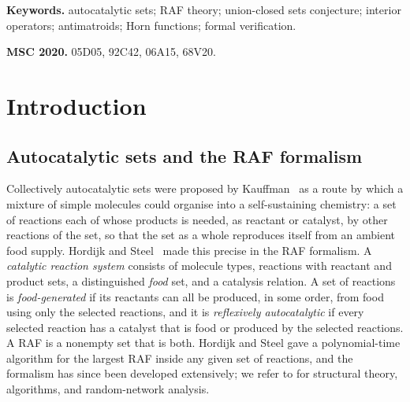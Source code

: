 \documentclass[11pt,a4paper]{article}
\theoremstyle{plain}
\theoremstyle{definition}
\theoremstyle{remark}
\begin{document}
\noindent\textbf{Keywords.} autocatalytic sets; RAF theory; union-closed sets conjecture; interior operators; antimatroids; Horn functions; formal verification.

\noindent\textbf{MSC 2020.} 05D05, 92C42, 06A15, 68V20.

\section{Introduction}\label{sec:intro}

\subsection{Autocatalytic sets and the RAF formalism}

Collectively autocatalytic sets were proposed by Kauffman~\cite{kauffman1986autocatalytic,kauffman1993origins}
as a route by which a mixture of simple molecules could organise into a self-sustaining
chemistry: a set of reactions each of whose products is needed, as reactant or
catalyst, by other reactions of the set, so that the set as a whole reproduces
itself from an ambient food supply. Hordijk and Steel~\cite{hordijk2004detecting}
made this precise in the RAF formalism. A \emph{catalytic reaction system}
consists of molecule types, reactions with reactant and product sets, a
distinguished \emph{food} set, and a catalysis relation. A set of reactions is
\emph{food-generated} if its reactants can all be produced, in some order, from
food using only the selected reactions, and it is \emph{reflexively autocatalytic}
if every selected reaction has a catalyst that is food or produced by the
selected reactions. A RAF is a nonempty set that is both. Hordijk and Steel gave a
polynomial-time algorithm for the largest RAF inside any given set of reactions,
and the formalism has since been developed extensively; we refer to
\cite{hordijk2017chasing,steel2019autocatalytic,mossel2005random} for structural
theory, algorithms, and random-network analysis.
\end{document}
